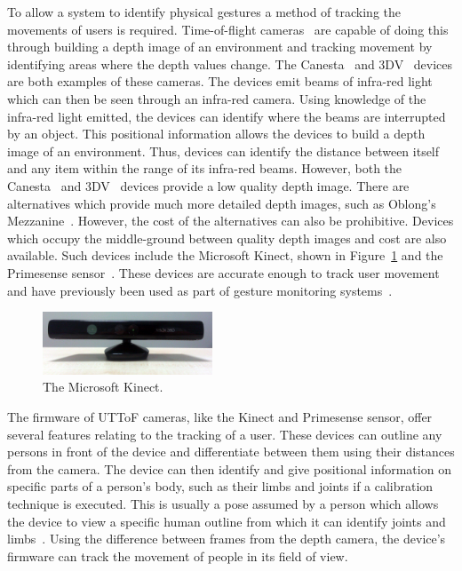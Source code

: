 \documentclass[manuscript, review, screen]{acmart}
\begin{document}
To allow a system to identify physical gestures a method of tracking the movements of users is required.
Time-of-flight cameras~\cite{Lange2001} are capable of doing this through building a depth image of an environment and tracking movement by identifying areas where the depth values change.
The Canesta~\cite{Yang2007} and 3DV~\cite{Wilson2007a} devices are both examples of these cameras.
The devices emit beams of infra-red light which can then be seen through an infra-red camera.
Using knowledge of the infra-red light emitted, the devices can identify where the beams are interrupted by an object.
This positional information allows the devices to build a depth image of an environment.
Thus, devices can identify the distance between itself and any item within the range of its infra-red beams.
However, both the Canesta~\cite{Yang2007} and 3DV~\cite{Wilson2007a} devices provide a low quality depth image.
There are alternatives which provide much more detailed depth images, such as Oblong's Mezzanine~\cite{kramer2011}.
However, the cost of the alternatives can also be prohibitive.
Devices which occupy the middle-ground between quality depth images and cost are also available.
Such devices include the Microsoft Kinect, shown in Figure~\ref{fig:kinect} and the Primesense sensor~\cite{Wilson2010}.
These devices are accurate enough to track user movement and have previously been used as part of gesture monitoring systems~\cite{Goth2011}.

\begin{figure}[h]
   \centering
   \includegraphics[width=0.45\textwidth]{figures/kinect.png}
   \caption{The Microsoft Kinect.}
   \label{fig:kinect}
\end{figure}

The firmware of \ac{UTToF} cameras, like the Kinect and Primesense sensor, offer several features relating to the tracking of a user.
These devices can outline any persons in front of the device and differentiate between them using their distances from the camera.
The device can then identify and give positional information on specific parts of a person's body, such as their limbs and joints if a calibration technique is executed.
This is usually a pose assumed by a person which allows the device to view a specific human outline from which it can identify joints and limbs~\cite{Xia2011}.
Using the difference between frames from the depth camera, the device's firmware can track the movement of people in its field of view.
\end{document}

